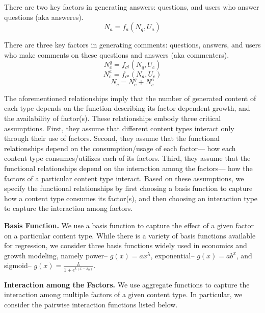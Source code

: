 There are two key factors in generating answers: questions, and users who answer questions (aka answeres). 
\begin{equation*}
N_a = f_a(N_q, U_a)
\end{equation*}

There are three key factors in generating comments: questions, answers, and users who make comments on these questions and answers (aka commenters). 
\begin{equation*}
N_c^q = f_{c^q}(N_q, U_c)
\end{equation*}
\begin{equation*}
N_c^a = f_{c^a}(N_a, U_c)
\end{equation*}
\begin{equation*}
N_c = N_c^q + N_c^a
\end{equation*}

The aforementioned relationships imply that the number of generated content of each type depends on the function describing its factor dependent growth, and the availability of factor(s). These relationships embody three critical assumptions. First, they assume that different content types interact only through their use of factors. Second, they assume that the functional relationships depend on the consumption/usage of each factor--- how each content type consumes/utilizes each of its factors. Third, they assume that the functional relationships depend on the interaction among the factors--- how the factors of a particular content type interact. Based on these assumptions, we specify the functional relationships by first choosing a basis function to capture how a content type consumes its factor(s), and then choosing an interaction type to capture the interaction among factors.

\textbf{Basis Function.} We use a basis function to capture the effect of a given factor on a particular content type. While there is a variety of basis functions available for regression, we consider three basis functions widely used in economics and growth modeling, namely power-- $g(x) = ax^{\lambda}$, exponential-- $g(x) = ab^x$, and sigmoid-- $g(x) = \frac{L}{1+e^{k(x-x_0)}}$. 

\textbf{Interaction among the Factors.} We use aggregate functions to capture the interaction among multiple factors of a given content type. In particular, we consider the pairwise interaction functions listed below. 

